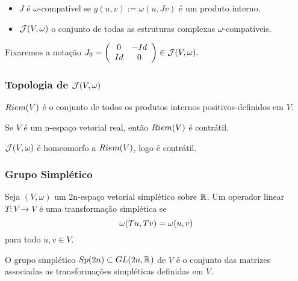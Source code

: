 \documentclass{beamer}
\begin{document}
\begin{footnotesize}
\begin{frame}
\begin{definicao}
\begin{itemize}
				\item $J$ é $\omega$-compatível se $g(u,v):=\omega(u, Jv)$ é um produto interno. 
				
				\item $\mathcal{J}(V, \omega)$ o conjunto de todas as estruturas complexas $\omega$-compatíveis.
				
			\end{itemize}
		\end{definicao}
		Fixaremos a notação
			$
			J_{0}=
			\left(
			\begin{array}{cc}
			0 & -Id
			\\
			Id & 0
			\end{array}
			\right) \in \mathcal{J}(V, \omega) .
			$
	\end{frame}
	
	\begin{frame}
		\frametitle{Topologia de $\mathcal{J}(V, \omega)$}
		\begin{definicao}
			$Riem(V)$ é o conjunto de todos os produtos internos positivos-definidos em $V$.
		\end{definicao}
		
		
		\begin{proposicao}
			Se $V$ é um n-espaço vetorial real, então $Riem(V)$ é contrátil.
		\end{proposicao}
		
		\begin{teorema}
			$\mathcal{J}(V, \omega)$ é homeomorfo a $Riem(V)$, logo é contrátil.
		\end{teorema}
	\end{frame}
	
	\begin{frame}
		\frametitle{Grupo Simplético}
		
		\begin{definicao}
			Seja $(V, \omega)$ um 2n-espaço vetorial simplético sobre $\mathbb{R}^{}$. Um operador linear $T: V \to V$ é uma transformação simplética se 
			$$
			\omega(Tu, Tv) = \omega(u, v)
			$$ para todo $u,v\in V$.
		\end{definicao}
		
		\begin{definicao}
			O grupo simplético $Sp(2n) \subset GL(2n, \mathbb{R}^{})$ de $V$ é o conjunto das matrizes associadas as transformações simpléticas definidas em $V$.
		\end{definicao}	
		

\end{frame}
\end{footnotesize}
\end{document}
